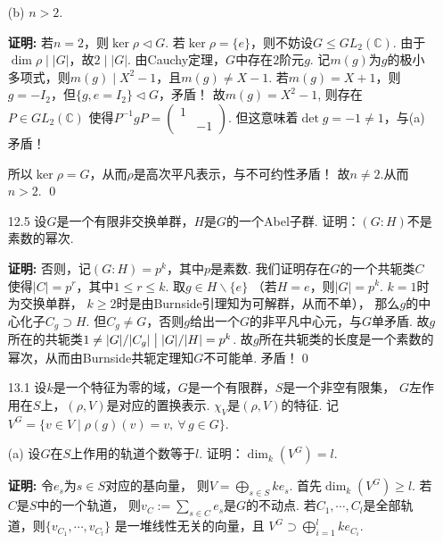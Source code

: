 \begin{enumerate}
            从而$\ker \varphi = G$，故$\det(\rho(g))=1$，$\forall \, g \in G$. \qed

        \item[(b)] $n > 2$.
        \item[\textbf{证明:}]
            若$n = 2$，则$\ker \rho \lhd G$.
            若$\ker \rho = \{e\}$，则不妨设$G \leq GL_{2}(\mathbb{C})$.
            由于$\dim \rho \mid |G|$，故$2 \mid |G|$. 
            由Cauchy定理，$G$中存在$2$阶元$g$.
            记$m(g)$为$g$的极小多项式，则$m(g) \mid X^{2} - 1$，且$m(g) \neq X - 1$.
            若$m(g) = X + 1$，则$g = - I_{2}$，但$\{g , e=I_{2}\} \lhd G$，矛盾！
            故$m(g) = X^{2} - 1$, 则存在$P \in GL_{2}(\mathbb{C})$
            使得$P^{-1}gP = \begin{pmatrix} 1 & \\ & -1\end{pmatrix}$.
            但这意味着$\det g = -1 \neq 1$，与(a)矛盾！

            所以$\ker \rho = G$，从而$\rho$是高次平凡表示，与不可约性矛盾！
            故$n \neq 2$.从而$n > 2$. \qed

        \item[12.5] 设$G$是一个有限非交换单群，$H$是$G$的一个Abel子群.
        证明：$(G:H)$不是素数的幂次.
        \item[\textbf{证明:}]
        否则，记$(G:H)=p^{k}$，其中$p$是素数. 
        我们证明存在$G$的一个共轭类$C$使得$|C|=p^{r}$，其中$1 \leq r \leq k$.
        取$g \in H \backslash \{e\}$
        （若$H=e$，则$|G| = p^{k}$. $k=1$时为交换单群，
        $k \geq 2$时是由Burnside引理知为可解群，从而不单），
        那么$g$的中心化子$C_{g} \supset H$. 
        但$C_{g} \neq G$，否则$g$给出一个$G$的非平凡中心元，与$G$单矛盾.
        故$g$所在的共轭类$1 \neq |G|/|C_{g}| \bigm| |G|/|H| = p^{k}$.
        故$g$所在共轭类的长度是一个素数的幂次，从而由Burnside共轭定理知$G$不可能单.
        矛盾！\qed

        \item[13.1] 设$k$是一个特征为零的域，$G$是一个有限群，$S$是一个非空有限集，
        $G$左作用在$S$上，$(\rho,V)$是对应的置换表示. $\chi_{V}$是$(\rho,V)$的特征.
        记$V^{G} = \{v \in V \mid \rho(g)(v)=v,\ \forall\,g\in G\}$.
        \item[(a)] 设$G$在$S$上作用的轨道个数等于$l$. 
            证明：$\dim_{k}(V^{G}) = l$.
        \item[\textbf{证明:}]
            令$e_{s}$为$s \in S$对应的基向量，
            则$V = \bigoplus\limits_{s \in S}ke_{s}$.
            首先$\dim_{k}(V^{G}) \geq l$. 若$C$是$S$中的一个轨道，
            则$v_{C}:=\sum\limits_{s \in C}e_{s}$是$G$的不动点. 
            若$C_{1},\cdots,C_{l}$是全部轨道，则$\{v_{C_{1}},\cdots,v_{C_{l}}\}$
            是一堆线性无关的向量，且
            $V^{G} \supset \bigoplus\limits_{i=1}^{l}ke_{C_{i}}$.


\end{enumerate}
